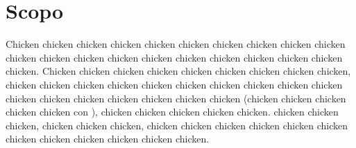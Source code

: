 \section*{Scopo}

Chicken chicken chicken chicken chicken chicken chicken chicken chicken chicken chicken chicken chicken chicken chicken chicken chicken chicken chicken chicken chicken. Chicken chicken chicken chicken chicken chicken chicken chicken chicken, chicken chicken chicken chicken chicken chicken chicken chicken chicken chicken chicken chicken chicken chicken chicken chicken chicken (chicken chicken chicken chicken chicken  con ),
chicken chicken chicken chicken chicken. chicken chicken chicken, chicken chicken chicken, chicken chicken chicken chicken chicken chicken chicken chicken chicken chicken chicken chicken.
